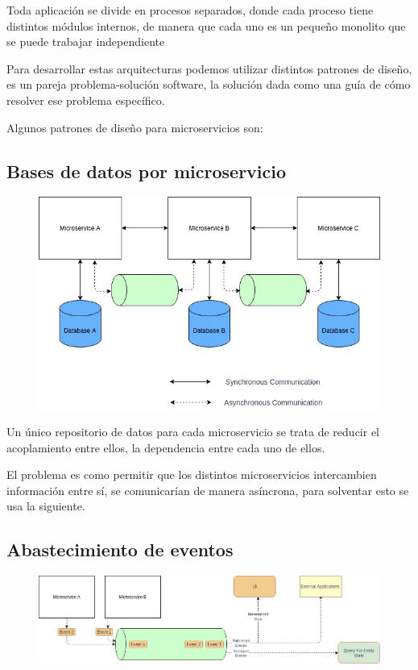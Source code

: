 \documentclass[12pt]{report} %
\begin{document}
Toda aplicación se divide en procesos separados, donde cada proceso tiene distintos módulos internos, de manera que cada uno es un pequeño monolito que se puede trabajar independiente

Para desarrollar estas arquitecturas podemos utilizar distintos patrones de diseño, es un pareja problema-solución software, la solución dada como una guía de cómo resolver ese problema específico.

Algunos patrones de diseño para microservicios son:

\subsection{Bases de datos por microservicio}
\begin{figure}[H]
	{\includegraphics[scale=.3]{1_WWJQH50jxgrqh-ABFRQuzQ.jpeg}}
\end{figure}

Un único repositorio de datos para cada microservicio se trata de reducir el acoplamiento entre ellos, la dependencia entre cada uno de ellos.

El problema es como permitir que los distintos microservicios intercambien información entre sí, se comunicarían de manera asíncrona, para solventar esto se usa la siguiente.

\subsection{Abastecimiento de eventos}
\begin{figure}[H]
	{\includegraphics[scale=.3]{1_tRDaroNg_GnGdCZDFxLFKQ.jpeg}}
\end{figure}
\end{document}
